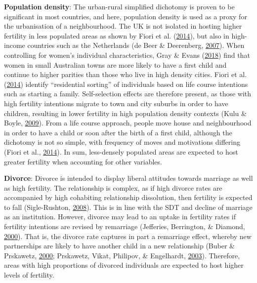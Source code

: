 \documentclass[12pt,twoside]{reedthesis}
\begin{document}
\textbf{Population density}: The urban-rural simplified dichotomy is proven to be significant in most countries, and here, population density is used as a proxy for the urbanisation of a neighbourhood. The UK is not isolated in hosting higher fertility in less populated areas as shown by Fiori et al. (\protect\hyperlink{ref-fiori2014}{2014}), but also in high-income countries such as the Netherlands (de Beer \& Deerenberg, \protect\hyperlink{ref-debeer2007}{2007}). When controlling for women's individual characteristics, Gray \& Evans (\protect\hyperlink{ref-gray2018}{2018}) find that women in small Australian towns are more likely to have a first child and continue to higher parities than those who live in high density cities. Fiori et al. (\protect\hyperlink{ref-fiori2014}{2014}) identify ``residential sorting'' of individuals based on life course intentions such as starting a family. Self-selection effects are therefore present, as those with high fertility intentions migrate to town and city suburbs in order to have children, resulting in lower fertility in high population density contexts (Kulu \& Boyle, \protect\hyperlink{ref-kulu2009}{2009}). From a life course approach, people move house and neighbourhood in order to have a child or soon after the birth of a first child, although the dichotomy is not so simple, with frequency of moves and motivations differing (Fiori et al., \protect\hyperlink{ref-fiori2014}{2014}). In sum, less-densely populated areas are expected to host greater fertility when accounting for other variables.

\textbf{Divorce}: Divorce is intended to display liberal attitudes towards marriage as well as high fertility. The relationship is complex, as if high divorce rates are accompanied by high cohabiting relationship dissolution, then fertility is expected to fall (Sigle-Rushton, \protect\hyperlink{ref-sigle-rushton2008}{2008}). This is in line with the SDT and decline of marriage as an institution. However, divorce may lead to an uptake in fertility rates if fertility intentions are revised by remarriage (Jefferies, Berrington, \& Diamond, \protect\hyperlink{ref-jefferies2000}{2000}). That is, the divorce rate captures in part a remarriage effect, whereby new partnerships are likely to have another child in a new relationship (Buber \& Prskawetz, \protect\hyperlink{ref-buber2000}{2000}; Prskawetz, Vikat, Philipov, \& Engelhardt, \protect\hyperlink{ref-prskawetz2003}{2003}). Therefore, areas with high proportions of divorced individuals are expected to host higher levels of fertility.
\end{document}
